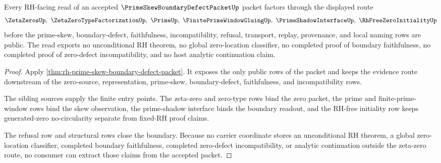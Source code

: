 \begin{theorem}
\label{thm:prime-skew-boundary-defect-conditional-nonescape}
Every RH-facing read of an accepted $\PrimeSkewBoundaryDefectPacketUp$ packet factors through the displayed route
$$
\ZetaZerosUp,\ \ZetaZeroTypeFactorizationUp,\ \PrimeUp,\ \FinitePrimeWindowGluingUp,\ \PrimeShadowInterfaceUp,\ \RhFreeZeroInitialityUp
$$
before the prime-skew, boundary-defect, faithfulness, incompatibility, refusal, transport, replay, provenance, and local naming rows are public. The read exports no unconditional RH theorem, no global zero-location classifier, no completed proof of boundary faithfulness, no completed proof of zero-defect incompatibility, and no host analytic continuation claim.
\end{theorem}
\begin{proof}
Apply \autoref{thm:rh-prime-skew-boundary-defect-packet}. It exposes the only public rows of the packet and keeps the evidence route downstream of the zero-source, representation, prime-skew, boundary-defect, faithfulness, and incompatibility rows.

The sibling sources supply the finite entry points. The zeta-zero and zero-type rows bind the zero packet, the prime and finite-prime-window rows bind the skew observation, the prime-shadow interface binds the boundary readout, and the RH-free initiality row keeps generated-zero no-circularity separate from fixed-RH proof claims.

The refusal row and structural rows close the boundary. Because no carrier coordinate stores an unconditional RH theorem, a global zero-location classifier, completed boundary faithfulness, completed zero-defect incompatibility, or analytic continuation outside the zeta-zero route, no consumer can extract those claims from the accepted packet.
\end{proof}



